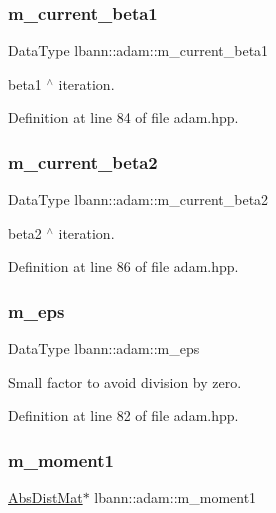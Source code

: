 \subsubsection{\texorpdfstring{m\+\_\+current\+\_\+beta1}{m\_current\_beta1}}
{\footnotesize\ttfamily Data\+Type lbann\+::adam\+::m\+\_\+current\+\_\+beta1\hspace{0.3cm}{\ttfamily [private]}}

beta1 $^\wedge$ iteration. 

Definition at line 84 of file adam.\+hpp.

\mbox{\label{classlbann_1_1adam_ad38376b684d69d4a15da1d11f8808ca7}} 
\subsubsection{\texorpdfstring{m\+\_\+current\+\_\+beta2}{m\_current\_beta2}}
{\footnotesize\ttfamily Data\+Type lbann\+::adam\+::m\+\_\+current\+\_\+beta2\hspace{0.3cm}{\ttfamily [private]}}

beta2 $^\wedge$ iteration. 

Definition at line 86 of file adam.\+hpp.

\mbox{\label{classlbann_1_1adam_a751102f0fd866612f5685050a08020a9}} 
\subsubsection{\texorpdfstring{m\+\_\+eps}{m\_eps}}
{\footnotesize\ttfamily Data\+Type lbann\+::adam\+::m\+\_\+eps\hspace{0.3cm}{\ttfamily [private]}}

Small factor to avoid division by zero. 

Definition at line 82 of file adam.\+hpp.

\mbox{\label{classlbann_1_1adam_aa10a518a5356257bc69e655b88b0ed67}} 
\subsubsection{\texorpdfstring{m\+\_\+moment1}{m\_moment1}}
{\footnotesize\ttfamily \hyperlink{base_8hpp_a9a697a504ae84010e7439ffec862b470}{Abs\+Dist\+Mat}$\ast$ lbann\+::adam\+::m\+\_\+moment1\hspace{0.3cm}{\ttfamily [private]}}

